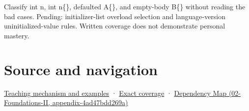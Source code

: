 Classify int n, int n\{\}, defaulted A\{\}, and empty-body B\{\} without reading the bad cases. Pending: initializer-list overload selection and language-version uninitialized-value rules. Written coverage does not demonstrate personal mastery.

\section{Source and navigation}\label{appendix-ba8c1a9fe03f-source-and-navigation}

\href{Continuous\%20Notes/Computing\%20Foundations\%20-\%20From\%20Bits\%20to\%20C++\%20and\%20Systems\%20APIs\#Empty\%20syntax\%20does\%20not\%20promise\%20initialized\%20members}{Teaching mechanism and examples} · \hyperref[appendix-fd090d982a15-m009---parts-127-147]{Exact coverage} · \href{../02-Foundations-II/main.pdf\#nameddest=appendix-4ad47bdd269a}{Dependency Map (02-Foundations-II, appendix-4ad47bdd269a)}
